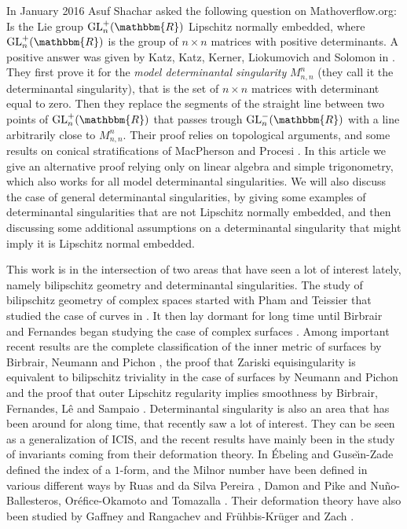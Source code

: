 \documentclass[a4paper,oneside]{amsart}
\theoremstyle{definition}
\begin{document}
In January 2016 Asuf Shachar asked the following question on
Mathoverflow.org: Is the Lie group ${\operatorname{GL}}_n^+({\mathbbm{R}})$ Lipschitz normally
embedded, where ${\operatorname{GL}}_n^+({\mathbbm{R}})$ is the group of $n\times n$ matrices
with positive determinants. A positive answer  was given by Katz,
Katz, Kerner, Liokumovich and Solomon
in \cite{kerneretc}. They first prove it for the
\emph{model determinantal singularity} $M^n_{n,n}$ (they call it the
determinantal
singularity), that is the set of $n\times n$ matrices with determinant
equal to zero. Then they replace the segments of the straight line
between two points of ${\operatorname{GL}}_n^+({\mathbbm{R}})$ that passes trough ${\operatorname{GL}}_n^-({\mathbbm{R}})$ with a line
arbitrarily close to $M^n_{n,n}$. Their proof relies on topological
arguments, and some results on conical stratifications of MacPherson
and Procesi \cite{macphersonprocesi}. In this article we give an
alternative proof relying only on linear algebra and simple
trigonometry, which also works for all model determinantal
singularities. We will also discuss the case of general determinantal
singularities, by giving some examples of determinantal singularities
that are not Lipschitz normally embedded, and then discussing some
additional assumptions on a determinantal singularity that might imply
it is Lipschitz normal embedded.    

This work is in the intersection of two areas that have seen a lot of
interest lately, namely bilipschitz geometry and determinantal
singularities. The study of bilipschitz geometry of complex spaces
started with Pham and Teissier that studied the case of curves in
\cite{phamteissier}. It then lay dormant for long time until Birbrair
and Fernandes began studying the case of complex surfaces
\cite{birbrairfernandes}. Among important recent results are the
complete classification of the inner metric of surfaces by Birbrair,
Neumann and Pichon \cite{thickthin}, the proof that Zariski
equisingularity is equivalent to bilipschitz triviality in the case of
surfaces by Neumann and Pichon \cite{zariski} and the proof that
outer Lipschitz regularity implies smoothness by Birbrair,
Fernandes, L\^{e} and Sampaio
\cite{lipschitzregularity}. Determinantal singularity is also an area
that has been around for along time, that recently saw a lot of
interest. They can be seen as a generalization of ICIS, and the recent
results have mainly been in the study of invariants coming from their
deformation theory. In \cite{ebelingguseinzade} \'Ebeling and
Guse{\u\i}n-Zade defined the index of a $1$-form, and the Milnor
number have been defined in various different ways by Ruas and da
Silva Pereira \cite{cedinhamiriam}, Damon and Pike \cite{damonpike}
and Nu\~no-Ballesteros, Or\'efice-Okamoto and Tomazalla
\cite{NunoOreficeOkamotoTomazella}. Their
deformation theory have also been studied by Gaffney and Rangachev
\cite{gaffenyrangachev} and Fr\"uhbis-Kr\"uger and Zach
\cite{fruhbiskrugerzach}.
\end{document}
